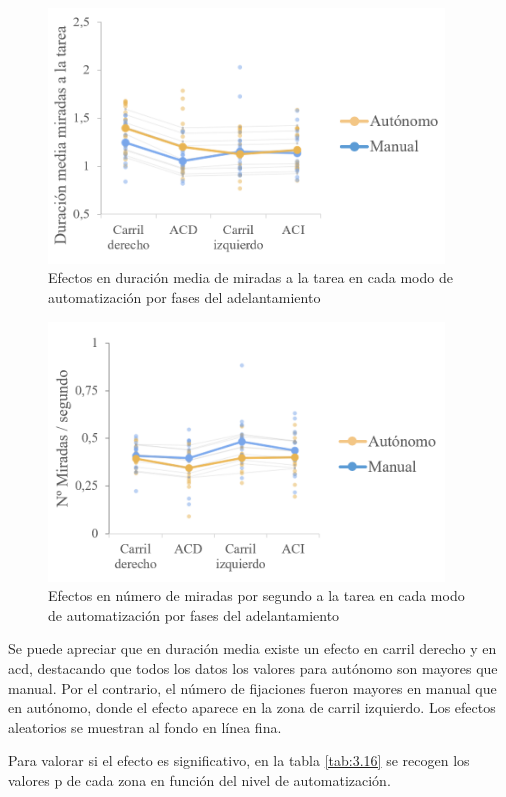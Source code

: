\begin{figure}[h]
    \centering
    \includegraphics[width=10.5cm]
    {figures/3.20.png}
    \caption{ \label{fig:3.20} Efectos en duración media de miradas a la tarea en cada modo de automatización por fases del adelantamiento}
\end{figure}

\begin{figure}[h]
    \centering
    \includegraphics[width=10.5cm]
    {figures/3.21.png}
    \caption{ \label{fig:3.21} Efectos en número de miradas por segundo a la tarea en cada modo de automatización por fases del adelantamiento}
\end{figure}

Se puede apreciar que en duración media existe un efecto en carril derecho y en \gls{acd}, destacando que todos los datos los valores para autónomo son mayores que manual. Por el contrario, el número de fijaciones fueron mayores en manual que en autónomo, donde el efecto aparece en la zona de carril izquierdo. Los efectos aleatorios se muestran al fondo en línea fina. 

Para valorar si el efecto es significativo, en la tabla \ref{tab:3.16} se recogen los valores p de cada zona en función del nivel de automatización.

